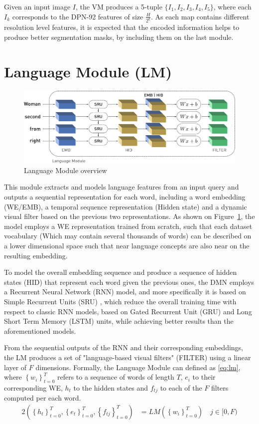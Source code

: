 Given an input image $I$, the VM produces a 5-tuple $\{I_1, I_2, I_3, I_4, I_5\}$, where each $I_k$ corresponds to the DPN-92 features of size $\frac{H}{2^k}$. As each map contains different resolution level features, it is expected that the encoded information helps to produce better segmentation masks, by including them on the last module.


\section{Language Module (LM)}
\begin{figure}
\centering
\includegraphics[width=\textwidth]{./figures/Language_Module.pdf}
\caption{Language Module overview}
\label{Fig:LM}
\end{figure}

This module extracts and models language features from an input query and outputs a sequential representation for each word, including a word embedding (WE/EMB), a temporal sequence representation (Hidden state) and a dynamic visual filter based on the previous two representations. As shown on Figure~\ref{Fig:LM}, the model employs a WE representation trained from scratch, such that each dataset vocabulary (Which may contain several thousands of words) can be described on a lower dimensional space such that near language concepts are also near on the resulting embedding.

To model the overall embedding sequence and produce a sequence of hidden states (HID) that represent each word given the previous ones, the DMN employs a Recurrent Neural Network (RNN) model, and more specifically it is based on Simple Recurrent Units (SRU) \cite{DBLP:journals/corr/abs-1709-02755}, which reduce the overall training time with respect to classic RNN models, based on Gated Recurrent Unit (GRU) and Long Short Term Memory (LSTM) units, while achieving better results than the aforementioned models.

From the sequential outputs of the RNN and their corresponding embeddings, the LM produces a set of "language-based visual filters" (FILTER) using a linear layer of $F$ dimensions. Formally, the Language Module can defined as \eqref{eq:lm}, where $\left\{w_i\right\}_{t=0}^{T}$ refers to a sequence of words of length $T$, $e_i$ to their corresponding WE, $h_t$ to the hidden states and $f_{tj}$ to each of the $F$ filters computed per each word.
\setlength{\abovedisplayskip}{0pt}
\setlength{\belowdisplayskip}{0pt}
\begin{alignat}{2}
\left(\left\{h_t\right\}_{t=0}^{T}, \left\{e_t\right\}_{t=0}^{T}, \left\{f_{tj}\right\}_{t=0}^{T} \right) &= LM\left(\left\{w_i\right\}_{t=0}^{T}\right) \quad j \in [0, F) \label{eq:lm}
\end{alignat}


